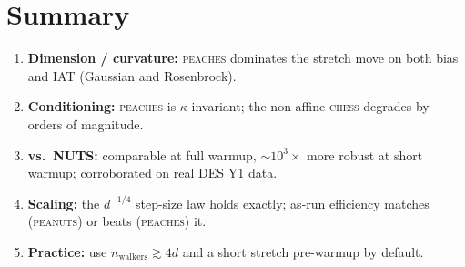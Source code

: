 \documentclass[11pt]{article}
\begin{document}
\section{Summary}
\begin{enumerate}\setlength\itemsep{2pt}
\item \textbf{Dimension / curvature:} \textsc{peaches} dominates the stretch
move on both bias and IAT (Gaussian and Rosenbrock).
\item \textbf{Conditioning:} \textsc{peaches} is $\kappa$-invariant; the
non-affine \textsc{chess} degrades by orders of magnitude.
\item \textbf{vs.\ NUTS:} comparable at full warmup, $\sim\!10^{3}\times$
more robust at short warmup; corroborated on real DES Y1 data.
\item \textbf{Scaling:} the $d^{-1/4}$ step-size law holds exactly; as-run
efficiency matches (\textsc{peanuts}) or beats (\textsc{peaches}) it.
\item \textbf{Practice:} use $n_{\text{walkers}}\!\gtrsim\!4d$ and a short
stretch pre-warmup by default.
\end{enumerate}
\end{document}
